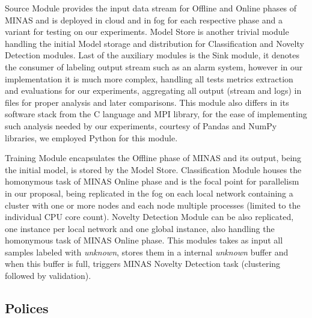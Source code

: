 Source Module provides the input data stream for Offline and Online phases of MINAS
and is deployed in cloud and in fog for each respective phase and a variant for
testing on our experiments.
Model Store is another trivial module handling the initial Model storage and distribution
for Classification and Novelty Detection modules.
Last of the auxiliary modules is the Sink module, it denotes the consumer of labeling
output stream such as an alarm system, however in our implementation it is much more
complex, handling all tests metrics extraction and evaluations for our experiments,
aggregating all output (stream and logs) in files for proper analysis and later comparisons.
This module also differs in its software stack from the C language and MPI library,
for the ease of implementing such analysis needed by our experiments, 
courtesy of Pandas and NumPy libraries, we employed Python for this module.


Training Module encapsulates the Offline phase of MINAS and its output, being the
initial model, is stored by the Model Store.
Classification Module houses the homonymous task of MINAS Online phase and
is the focal point for parallelism in our proposal,
being replicated in the fog on each local network containing a cluster with one
or more nodes and each node multiple processes (limited to the individual CPU core count).
Novelty Detection Module can be also replicated,
one instance per local network and one global instance,
also handling the homonymous task of MINAS Online phase.
This modules takes as input all samples labeled with \emph{unknown},
stores them in a internal \emph{unknown} buffer and when this buffer is full,
triggers MINAS Novelty Detection task (clustering followed by validation).


\subsection{Polices}\label{sec:polices}


